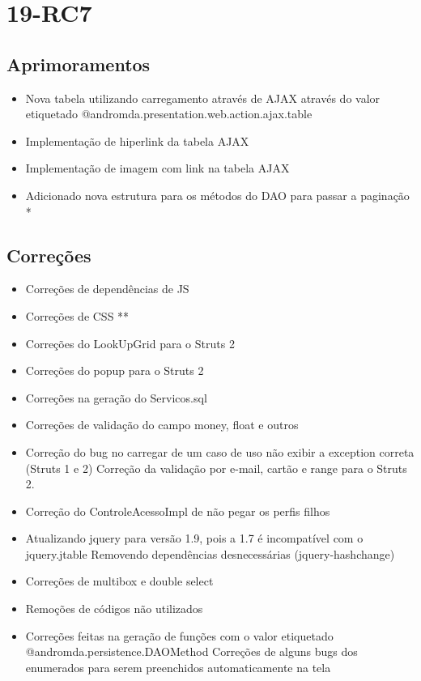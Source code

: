 \section{19-RC7}

\subsection{Aprimoramentos}

\begin{itemize}
  \item Nova tabela utilizando carregamento através de AJAX através do valor
  etiquetado @andromda.presentation.web.action.ajax.table
  \item Implementação de hiperlink da tabela AJAX 
  \item Implementação de imagem com link na tabela AJAX
  \item Adicionado nova estrutura para os métodos do DAO para passar a paginação
*
\end{itemize}

\subsection{Correções}

\begin{itemize}
  \item Correções de dependências de JS 
  \item Correções de CSS **
  \item Correções do LookUpGrid para o Struts 2
  \item Correções do popup para o Struts 2
  \item Correções na geração do Servicos.sql
  \item Correções de validação do campo money, float e outros 
  \item Correção do bug no carregar de um caso de uso não exibir a exception
correta (Struts 1 e 2) Correção da validação por e-mail, cartão e range para o
Struts 2.
  \item Correção do ControleAcessoImpl de não pegar os perfis filhos 
  \item Atualizando jquery para versão 1.9, pois a 1.7 é incompatível com o
jquery.jtable Removendo dependências desnecessárias (jquery-hashchange)
  \item Correções de multibox e double select
  \item Remoções de códigos não utilizados
  \item Correções feitas na geração de funções com o valor etiquetado
@andromda.persistence.DAOMethod Correções de alguns bugs dos enumerados para
serem preenchidos automaticamente na tela
\end{itemize}

